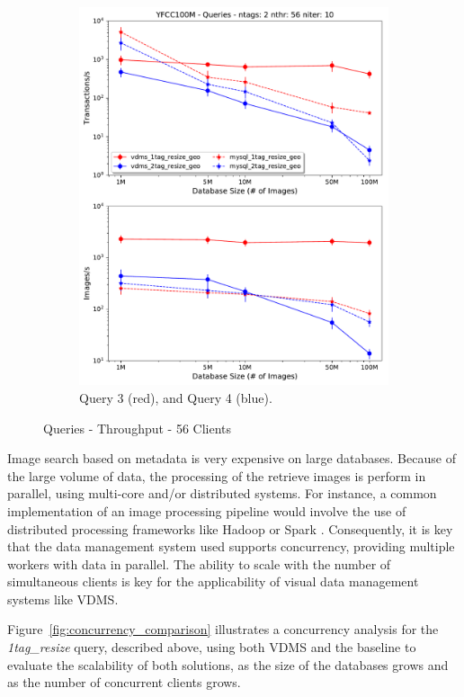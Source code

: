 \begin{figure}[ht]
\begin{subfigure}{.5\linewidth}
  \includegraphics[width=\columnwidth]{figures/queries_throughput_56_q3_q4}
  \caption{Query 3 (red), and Query 4 (blue).}
  \label{fig:q3_q4}
\end{subfigure}
\caption{Queries - Throughput - 56 Clients}
\label{fig:q_throughput_56}
\end{figure}

Image search based on metadata is very expensive on large databases.
Because of the large volume of data, the processing of the retrieve images
is perform in parallel, using multi-core and/or distributed systems.
For instance, a common implementation of an image processing pipeline
would involve the use of distributed processing frameworks
like Hadoop \cite{hadoop} or Spark \cite{spark}.
Consequently, it is key that the data management system used supports
concurrency, providing multiple workers with data in parallel.
The ability to scale with the number of simultaneous clients is key for the
applicability of visual data management systems like VDMS.

Figure~\ref{fig:concurrency_comparison} illustrates a concurrency analysis for
the \textit{1tag\_resize} query, described above, using both VDMS and
the baseline to evaluate the scalability of both solutions, as the
size of the databases grows and as the number of concurrent clients grows.

